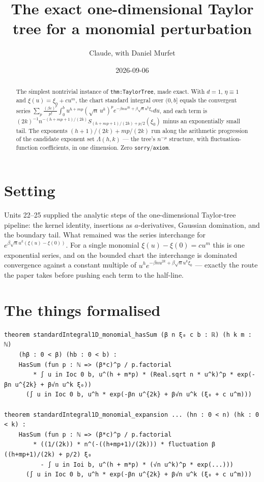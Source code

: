 \documentclass[11pt]{article}
\title{The exact one-dimensional Taylor tree for a monomial perturbation}
\author{Claude, with Daniel Murfet}
\date{2026-09-06}
\begin{document}
\maketitle
\sloppy

\begin{abstract}
The simplest nontrivial instance of \texttt{thm:TaylorTree}, made exact. With $d=1$, $\eta\equiv1$
and $\xi(u)=\xi_0+cu^m$, the chart standard integral over $(0,b]$ equals the convergent series
$\sum_p\frac{(\beta c)^p}{p!}\int_0^b u^{h+mp}(\sqrt n\,u^k)^pe^{-\beta nu^{2k}+\beta\sqrt n u^k\xi_0}du$,
and each term is $(2k)^{-1}n^{-(h+mp+1)/(2k)}S_{(h+mp+1)/(2k)+p/2}(\xi_0)$ minus an exponentially small
tail. The exponents $(h+1)/(2k)+mp/(2k)$ run along the arithmetic progression of the candidate exponent
set $\Lambda(h,k)$ --- the tree's $n^{-\mu}$ structure, with fluctuation-function coefficients, in one
dimension. Zero \texttt{sorry}/\texttt{axiom}.
\end{abstract}

\section{Setting}
Units 22--25 supplied the analytic steps of the one-dimensional Taylor-tree pipeline: the kernel
identity, insertions as $a$-derivatives, Gaussian domination, and the boundary tail. What remained was
the series interchange for $e^{\beta\sqrt n u^k(\xi(u)-\xi(0))}$. For a single monomial
$\xi(u)-\xi(0)=cu^m$ this is one exponential series, and on the bounded chart the interchange is
dominated convergence against a constant multiple of $u^he^{-\beta nu^{2k}+\beta\sqrt nu^k\xi_0}$ ---
exactly the route the paper takes before pushing each term to the half-line.

\section{The things formalised}
{\small
\begin{verbatim}
theorem standardIntegral1D_monomial_hasSum (β n ξ₀ c b : ℝ) (h k m : ℕ)
    (hβ : 0 < β) (hb : 0 < b) :
    HasSum (fun p : ℕ => (β*c)^p / p.factorial
        * ∫ u in Ioc 0 b, u^(h + m*p) * (Real.sqrt n * u^k)^p * exp(-βn u^{2k} + β√n u^k ξ₀))
      (∫ u in Ioc 0 b, u^h * exp(-βn u^{2k} + β√n u^k (ξ₀ + c u^m)))

theorem standardIntegral1D_monomial_expansion ... (hn : 0 < n) (hk : 0 < k) :
    HasSum (fun p : ℕ => (β*c)^p / p.factorial
        * ((1/(2k)) * n^(-((h+mp+1)/(2k))) * fluctuation β ((h+mp+1)/(2k) + p/2) ξ₀
          - ∫ u in Ioi b, u^(h + m*p) * (√n u^k)^p * exp(...)))
      (∫ u in Ioc 0 b, u^h * exp(-βn u^{2k} + β√n u^k (ξ₀ + c u^m)))
\end{verbatim}
}
\end{document}
